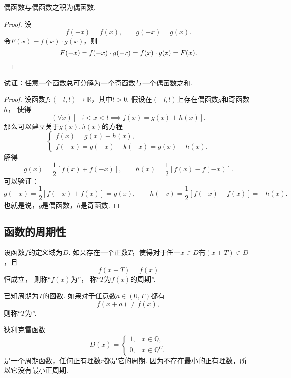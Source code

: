 \begin{property}
偶函数与偶函数之积为偶函数.
\begin{proof}
设\[
f(-x) = f(x), \qquad g(-x) = g(x).
\]令\(F(x) = f(x) \cdot g(x)\)，则\[
F(-x) = f(-x) \cdot g(-x) = f(x) \cdot g(x) = F(x).
\qedhere
\]
\end{proof}
\end{property}

\begin{example}\label{example:函数.任一函数可拆为奇偶函数之和}
试证：任意一个函数总可分解为一个奇函数与一个偶函数之和.
\begin{proof}
设函数\(f\colon(-l,l)\to\mathbb{R}\)，其中\(l>0\).
假设在\((-l,l)\)上存在偶函数\(g\)和奇函数\(h\)，
使得\[
	(\forall x)
	[-l<x<l \implies f(x) = g(x)+h(x)].
\]
那么可以建立关于\(g(x),h(x)\)的方程\[
	\left\{ \begin{array}{l}
		f(x) = g(x) + h(x), \\
		f(-x) = g(-x) + h(-x) = g(x) - h(x).
	\end{array} \right.
\]
解得\[
	g(x) = \frac12 [f(x) + f(-x)], \qquad
	h(x) = \frac12 [f(x) - f(-x)].
\]
可以验证：\[
	g(-x) = \frac12 [f(-x) + f(x)] = g(x), \qquad
	h(-x) = \frac12 [f(-x) - f(x)] = -h(x).
\]
也就是说，\(g\)是偶函数，\(h\)是奇函数.
\end{proof}
\end{example}

\subsection{函数的周期性}
\begin{definition}
设函数\(f\)的定义域为\(D\).
如果存在一个正数\(T\)，使得对于任一\(x \in D\)有\((x + T) \in D\)，且\[
	f(x+ T) = f(x)
\]恒成立，
则称“\(f(x)\)为”，
称“\(T\)为\(f(x)\)的周期”.

已知周期为\(T\)的函数.
如果对于任意数\(a \in (0,T)\)都有\[
	f(x + a) \neq f(x),
\]
则称“\(T\)为”.
\end{definition}

\begin{example}
狄利克雷函数\[
	D(x) = \left\{ \begin{array}{ll}
		1, & x \in \mathbb{Q}, \\
		0, & x \in \mathbb{Q}^C.
	\end{array} \right.
\]是一个周期函数，任何正有理数\(r\)都是它的周期.
因为不存在最小的正有理数，所以它没有最小正周期.
\end{example}
